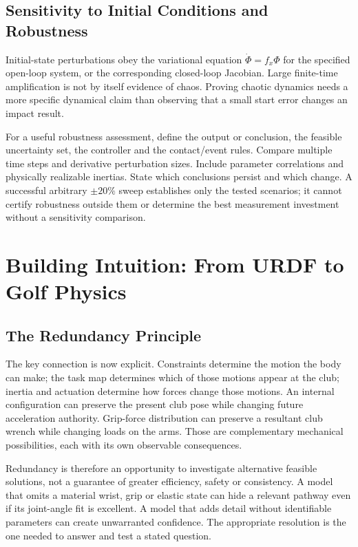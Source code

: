 \subsection{Sensitivity to Initial Conditions and Robustness}

Initial-state perturbations obey the variational equation $\dot\Phi=f_x\Phi$ for the specified open-loop system, or the corresponding closed-loop Jacobian. Large finite-time amplification is not by itself evidence of chaos. Proving chaotic dynamics needs a more specific dynamical claim than observing that a small start error changes an impact result.

\label{princ:prin:sensitivity_practical}
For a useful robustness assessment, define the output or conclusion, the feasible uncertainty set, the controller and the contact/event rules. Compare multiple time steps and derivative perturbation sizes. Include parameter correlations and physically realizable inertias. State which conclusions persist and which change. A successful arbitrary $\pm20\%$ sweep establishes only the tested scenarios; it cannot certify robustness outside them or determine the best measurement investment without a sensitivity comparison.

\section{Building Intuition: From URDF to Golf Physics}
\label{sec:intuition}

\subsection{The Redundancy Principle}

The key connection is now explicit. Constraints determine the motion the body can make; the task map determines which of those motions appear at the club; inertia and actuation determine how forces change those motions. An internal configuration can preserve the present club pose while changing future acceleration authority. Grip-force distribution can preserve a resultant club wrench while changing loads on the arms. Those are complementary mechanical possibilities, each with its own observable consequences.

Redundancy is therefore an opportunity to investigate alternative feasible solutions, not a guarantee of greater efficiency, safety or consistency. A model that omits a material wrist, grip or elastic state can hide a relevant pathway even if its joint-angle fit is excellent. A model that adds detail without identifiable parameters can create unwarranted confidence. The appropriate resolution is the one needed to answer and test a stated question.

